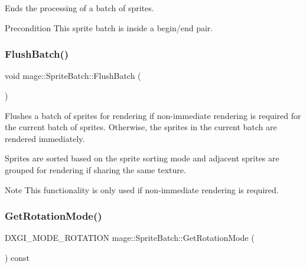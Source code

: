 Ends the processing of a batch of sprites.

\begin{DoxyPrecond}{Precondition}
This sprite batch is inside a begin/end pair. 
\end{DoxyPrecond}
\hypertarget{classmage_1_1_sprite_batch_a352714b5d02590245ab8ffe8489305f7}{}\label{classmage_1_1_sprite_batch_a352714b5d02590245ab8ffe8489305f7} 
\subsubsection{\texorpdfstring{Flush\+Batch()}{FlushBatch()}}
{\footnotesize\ttfamily void mage\+::\+Sprite\+Batch\+::\+Flush\+Batch (\begin{DoxyParamCaption}{ }\end{DoxyParamCaption})\hspace{0.3cm}{\ttfamily [private]}}

Flushes a batch of sprites for rendering if non-\/immediate rendering is required for the current batch of sprites. Otherwise, the sprites in the current batch are rendered immediately.

Sprites are sorted based on the sprite sorting mode and adjacent sprites are grouped for rendering if sharing the same texture.

\begin{DoxyNote}{Note}
This functionality is only used if non-\/immediate rendering is required. 
\end{DoxyNote}
\hypertarget{classmage_1_1_sprite_batch_ae38132bcf084f268dae7bfcc3b9c9a4d}{}\label{classmage_1_1_sprite_batch_ae38132bcf084f268dae7bfcc3b9c9a4d} 
\subsubsection{\texorpdfstring{Get\+Rotation\+Mode()}{GetRotationMode()}}
{\footnotesize\ttfamily D\+X\+G\+I\+\_\+\+M\+O\+D\+E\+\_\+\+R\+O\+T\+A\+T\+I\+ON mage\+::\+Sprite\+Batch\+::\+Get\+Rotation\+Mode (\begin{DoxyParamCaption}{ }\end{DoxyParamCaption}) const\hspace{0.3cm}{\ttfamily [noexcept]}}

